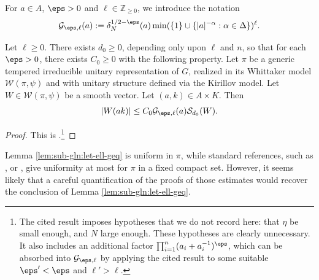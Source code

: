 For $a \in A$, $\eps > 0$ and $\ell \in \mathbb{Z}_{\geq 0}$, we introduce the notation
\begin{equation*}
  \mathcal{G}_{\eps,\ell}(a) := \delta_N^{1/2-\eps}(a)
  \min (\{1\} \cup \{|a|^{-\alpha} : \alpha \in \Delta \})^{\ell}.
\end{equation*}

\begin{lemma}\label{lem:sub-gln:let-ell-geq}
  Let $\ell \geq 0$.  There exists $d_0 \geq 0$, depending only upon $\ell$ and $n$, so that for each $\eps > 0$, there exists $C_0 \geq 0$ with the following property.  Let $\pi$ be a generic tempered irreducible unitary representation of $G$, realized in its Whittaker model $\mathcal{W}(\pi,\psi)$ and with unitary structure defined via the Kirillov model.  Let $W \in \mathcal{W}(\pi,\psi)$ be a smooth vector.  Let $(a,k) \in A \times K$.  Then
  \begin{equation*}
    |W(a k)| \leq C_0 \mathcal{G}_{\eps,\ell}(a) \mathcal{S}_{d_0}(W).
  \end{equation*}
\end{lemma}
\begin{proof}
  This is \cite[Lemma 5.2]{JN19a}.\footnote{The cited result imposes hypotheses that we do not record here: that $\eta$ be small enough, and $N$ large enough.  These hypotheses are clearly unnecessary.  It also includes an additional factor $\prod_{i=1}^{n} (a_i + a_i^{-1})^\eps$, which can be absorbed into $\mathcal{G}_{\eps,\ell}$ by applying the cited result to some suitable $\eps ' < \eps$ and $\ell ' > \ell$.}
\end{proof}
\begin{remark}
  Lemma \ref{lem:sub-gln:let-ell-geq} is uniform in $\pi$, while standard references, such as \cite[Prop 3.5]{MR2533003}, \cite[\S15]{MR1170566} or \cite[Prop 9]{MR2058615}, give uniformity at most for $\pi$ in a fixed compact set.  However, it seems likely that a careful quantification of the proofs of those estimates would recover the conclusion of Lemma \ref{lem:sub-gln:let-ell-geq}.
\end{remark}

